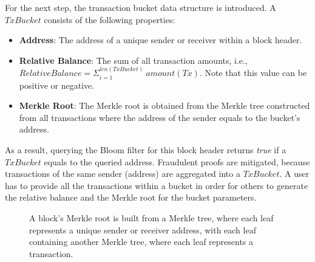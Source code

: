 \documentclass[conference]{IEEEtran}
\begin{document}
For the next step, the transaction bucket data structure is introduced. A $TxBucket$ consists of the following properties: 
\begin{itemize}
	\item \textbf{Address}: The address of a unique sender or receiver within a block header.
	\item \textbf{Relative Balance}: The sum of all transaction amounts, i.e., $RelativeBalance = \Sigma^{len(TxBucket)}_{i = 1}\ amount(Tx)$. Note that this value can be positive or negative.
	\item \textbf{Merkle Root}: The Merkle root is obtained from the Merkle tree constructed from all transactions where the address of the sender equals to the bucket's address.
\end{itemize}

As a result, querying the Bloom filter for this block header returns \textit{true} if a $TxBucket$ equals to the queried address. Fraudulent proofs are mitigated, because transactions of the same sender (address) are aggregated into a $TxBucket$. A user has to provide all the transactions within a bucket in order for others to generate the relative balance and the Merkle root for the bucket parameters.

\begin{figure}[hbt]
\centering
{} 
\caption{A block's Merkle root is built from a Merkle tree, where each leaf represents a unique sender or receiver address, with each leaf containing another Merkle tree, where each leaf represents a transaction.\label{fig:MerkleTreeAggTx}}
\end{figure}
\end{document}
